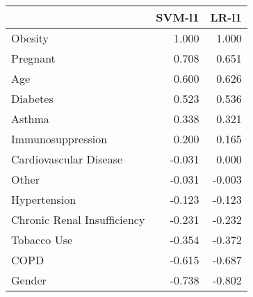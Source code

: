 \begin{tabular}{lrr}
\toprule
{} &  SVM-l1 &  LR-l1 \\
\midrule
Obesity                     &   1.000 &  1.000 \\
Pregnant                    &   0.708 &  0.651 \\
Age                         &   0.600 &  0.626 \\
Diabetes                    &   0.523 &  0.536 \\
Asthma                      &   0.338 &  0.321 \\
Immunosuppression           &   0.200 &  0.165 \\
Cardiovascular Disease      &  -0.031 &  0.000 \\
Other                       &  -0.031 & -0.003 \\
Hypertension                &  -0.123 & -0.123 \\
Chronic Renal Insufficiency &  -0.231 & -0.232 \\
Tobacco Use                 &  -0.354 & -0.372 \\
COPD                        &  -0.615 & -0.687 \\
Gender                      &  -0.738 & -0.802 \\
\bottomrule
\end{tabular}
